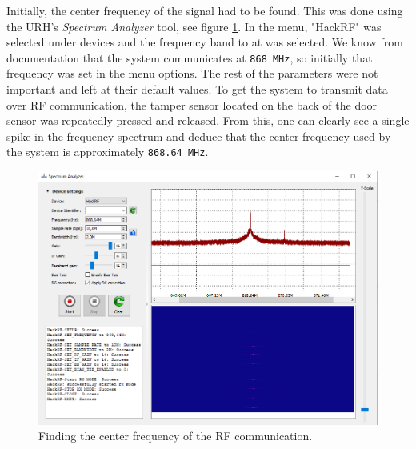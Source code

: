 Initially, the center frequency of the signal had to be found. This was done using the URH's \textit{Spectrum Analyzer} tool, see figure \ref{fig:finding-center-freq}. In the menu, "HackRF" was selected under devices and the frequency band to at was selected. We know from documentation that the system communicates at \texttt{868 MHz}, so initially that frequency was set in the menu options. The rest of the parameters were not important and left at their default values. To get the system to transmit data over RF communication, the tamper sensor located on the back of the door sensor was repeatedly pressed and released. From this, one can clearly see a single spike in the frequency spectrum and deduce that the center frequency used by the system is approximately \texttt{868.64 MHz}.
\begin{figure}[!ht]
    \centering
    \includegraphics[width=\textwidth]{images/6-pentesting/find-frequency.png}
    \caption{Finding the center frequency of the RF communication.}
    \label{fig:finding-center-freq}
\end{figure}

